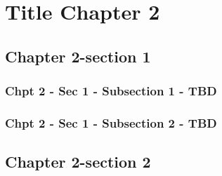 \chapter{Title Chapter 2}
\label{sec:chapter2}

\minitoc 


	\section{Chapter 2-section 1}
\label{sec:chapter_1_sec_1}

\subsection{Chpt 2 - Sec 1 - Subsection 1 - TBD}


\subsection{Chpt 2 - Sec 1 - Subsection 2 - TBD}



	\section{Chapter 2-section 2}
\label{sec:chapter_2_sec_2}